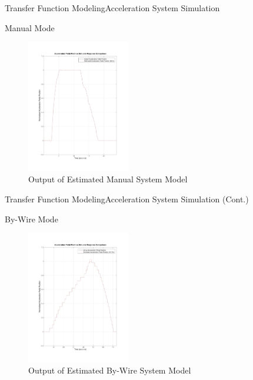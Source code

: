 \documentclass{beamer}
\begin{document}
\begin{frame}{Transfer Function Modeling}{Acceleration System Simulation}
	\begin{block}{Manual Mode}
 		\begin{figure}
	    		\centering
	    		\includegraphics[width=0.4\textwidth]{figs/img/manualAccelTransferFunctionModel}
	        \caption{Output of Estimated Manual System Model}
	        \label{fig:manualAccelModel}
		\end{figure}
  	\end{block}
\end{frame}

\begin{frame}{Transfer Function Modeling}{Acceleration System Simulation (Cont.)}
	\begin{block}{By-Wire Mode}
		\begin{figure}
    			\centering
    			\includegraphics[width=0.4\textwidth]{figs/img/byWireAccelArxModel}
    			\caption{Output of Estimated By-Wire System Model}
        		\label{fig:byWireSteerModel}
 		\end{figure}
	\end{block}
\end{frame}
\end{document}
